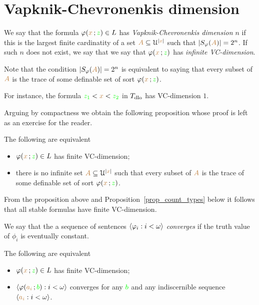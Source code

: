 \documentclass[creche.tex]{subfiles}
\begin{document}
\section{Vapknik-Chevronenkis dimension}
\label{sectionVC}

\def\ceq#1#2#3{\parbox{25ex}{$\displaystyle #1$}\medrel{#2}$\displaystyle  #3$}

We say that the formula $\varphi({\color{brown} x}\,;{\color{green} z})\in L$ has \emph{Vapknik-Chevronenkis dimension $n$\/} if this is the largest finite cardinatity of a set ${\color{brown} A}\subseteq\EuScript U^{|{\color{brown} x}|}$ such that $|S_\varphi({\color{brown} A})|=2^n$. If such $n$ does not exist, we say that we say that  $\varphi({\color{brown} x}\,;{\color{green} z})$ has \emph{infinite VC-dimension}. 

Note that the condition $|S_\varphi({\color{brown} A})|=2^n$ is equivalent to saying that every subset of ${\color{brown} A}$ is the trace of some definable set of sort $\varphi({\color{brown} x}\,;{\color{green} z})$.

For instance, the formula ${\color{green} z_1}<{\color{brown} x}<{\color{green} z_2}$ in $T_{\rm dlo}$ has VC-dimension $1$.

Arguing by compactness we obtain the following proposition whose proof is left as an exercise for the reader.

\begin{proposition}
The following are equivalent 
\begin{itemize}
\item[1.] $\varphi({\color{brown} x}\,;{\color{green} z})\in L$ has finite VC-dimension;
\item[2.] there is no infinite set ${\color{brown} A}\subseteq\EuScript U^{|{\color{brown} x}|}$ such that every subset of ${\color{brown} A}$ is the trace of some definable set of sort $\varphi({\color{brown} x}\,;{\color{green} z})$.\QED
\end{itemize}
\end{proposition}

From the proposition above and Proposition~\ref{prop_count_types} below it follows that all stable formulas have finite VC-dimension.

We say that the a sequence of sentences $\langle\varphi_i:i<\omega\rangle$ \emph{converges\/} if the truth value of $\phi_i$ is eventually constant.

\begin{lemma}\label{lem_altrank}
The following are equivalent
\begin{itemize}
\item[1.] $\varphi({\color{brown} x}\,;{\color{green} z})\in L$ has finite VC-dimension;
\item[2.] $\langle\varphi({\color{brown} a_i}\,;{\color{green} b}):i<\omega\rangle$ converges for any ${\color{green} b}$ and any indiscernible sequence $\langle{\color{brown}a_i}:i<\omega\rangle$.
\end{itemize}
\end{lemma}
\end{document}
